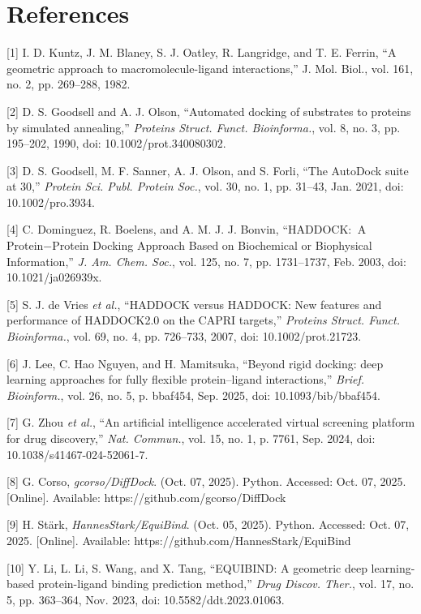 \hypertarget{references}{%
\chapter{References}\label{references}}

{[}1{]} I. D. Kuntz, J. M. Blaney, S. J. Oatley, R. Langridge, and T. E. Ferrin, ``A geometric approach to macromolecule-ligand interactions,'' J. Mol. Biol., vol. 161, no. 2, pp. 269--288, 1982.

{[}2{]} D. S. Goodsell and A. J. Olson, ``Automated docking of substrates to proteins by simulated annealing,'' \emph{Proteins Struct. Funct. Bioinforma.}, vol. 8, no. 3, pp. 195--202, 1990, doi: 10.1002/prot.340080302.

{[}3{]} D. S. Goodsell, M. F. Sanner, A. J. Olson, and S. Forli, ``The AutoDock suite at 30,'' \emph{Protein Sci. Publ. Protein Soc.}, vol. 30, no. 1, pp. 31--43, Jan. 2021, doi: 10.1002/pro.3934.

{[}4{]} C. Dominguez, R. Boelens, and A. M. J. J. Bonvin, ``HADDOCK:  A Protein−Protein Docking Approach Based on Biochemical or Biophysical Information,'' \emph{J. Am. Chem. Soc.}, vol. 125, no. 7, pp. 1731--1737, Feb. 2003, doi: 10.1021/ja026939x.

{[}5{]} S. J. de Vries \emph{et al.}, ``HADDOCK versus HADDOCK: New features and performance of HADDOCK2.0 on the CAPRI targets,'' \emph{Proteins Struct. Funct. Bioinforma.}, vol. 69, no. 4, pp. 726--733, 2007, doi: 10.1002/prot.21723.

{[}6{]} J. Lee, C. Hao Nguyen, and H. Mamitsuka, ``Beyond rigid docking: deep learning approaches for fully flexible protein--ligand interactions,'' \emph{Brief. Bioinform.}, vol. 26, no. 5, p. bbaf454, Sep. 2025, doi: 10.1093/bib/bbaf454.

{[}7{]} G. Zhou \emph{et al.}, ``An artificial intelligence accelerated virtual screening platform for drug discovery,'' \emph{Nat. Commun.}, vol. 15, no. 1, p. 7761, Sep. 2024, doi: 10.1038/s41467-024-52061-7.

{[}8{]} G. Corso, \emph{gcorso/DiffDock}. (Oct. 07, 2025). Python. Accessed: Oct. 07, 2025. {[}Online{]}. Available: https://github.com/gcorso/DiffDock

{[}9{]} H. Stärk, \emph{HannesStark/EquiBind}. (Oct. 05, 2025). Python. Accessed: Oct. 07, 2025. {[}Online{]}. Available: https://github.com/HannesStark/EquiBind

{[}10{]} Y. Li, L. Li, S. Wang, and X. Tang, ``EQUIBIND: A geometric deep learning-based protein-ligand binding prediction method,'' \emph{Drug Discov. Ther.}, vol. 17, no. 5, pp. 363--364, Nov. 2023, doi: 10.5582/ddt.2023.01063.

